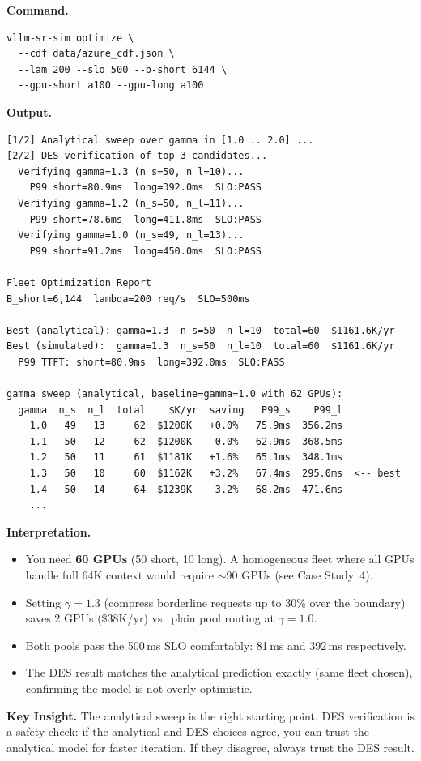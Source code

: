 \documentclass[11pt,a4paper]{article}
\newenvironment{keyinsight}
  {\begin{mdframed}[backgroundcolor=blue!5!white,linecolor=blue!60!black,linewidth=1pt]
   \textbf{Key Insight. }\ignorespaces}
  {\end{mdframed}}
\begin{document}
\textbf{Command.}
\begin{lstlisting}[style=shell]
vllm-sr-sim optimize \
  --cdf data/azure_cdf.json \
  --lam 200 --slo 500 --b-short 6144 \
  --gpu-short a100 --gpu-long a100
\end{lstlisting}

\textbf{Output.}
\begin{lstlisting}[style=output]
[1/2] Analytical sweep over gamma in [1.0 .. 2.0] ...
[2/2] DES verification of top-3 candidates...
  Verifying gamma=1.3 (n_s=50, n_l=10)...
    P99 short=80.9ms  long=392.0ms  SLO:PASS
  Verifying gamma=1.2 (n_s=50, n_l=11)...
    P99 short=78.6ms  long=411.8ms  SLO:PASS
  Verifying gamma=1.0 (n_s=49, n_l=13)...
    P99 short=91.2ms  long=450.0ms  SLO:PASS

Fleet Optimization Report
B_short=6,144  lambda=200 req/s  SLO=500ms

Best (analytical): gamma=1.3  n_s=50  n_l=10  total=60  $1161.6K/yr
Best (simulated):  gamma=1.3  n_s=50  n_l=10  total=60  $1161.6K/yr
  P99 TTFT: short=80.9ms  long=392.0ms  SLO:PASS

gamma sweep (analytical, baseline=gamma=1.0 with 62 GPUs):
  gamma  n_s  n_l  total    $K/yr  saving   P99_s    P99_l
    1.0   49   13     62  $1200K   +0.0%   75.9ms  356.2ms
    1.1   50   12     62  $1200K   -0.0%   62.9ms  368.5ms
    1.2   50   11     61  $1181K   +1.6%   65.1ms  348.1ms
    1.3   50   10     60  $1162K   +3.2%   67.4ms  295.0ms  <-- best
    1.4   50   14     64  $1239K   -3.2%   68.2ms  471.6ms
    ...
\end{lstlisting}

\textbf{Interpretation.}
\begin{itemize}[nosep]
  \item You need \textbf{60 GPUs} (50 short, 10 long).  A homogeneous
    fleet where all GPUs handle full 64K context would require $\sim$90
    GPUs (see Case Study~4).
  \item Setting $\gamma = 1.3$ (compress borderline requests up to
    30\% over the boundary) saves 2 GPUs (\$38K/yr) vs.\ plain pool
    routing at $\gamma = 1.0$.
  \item Both pools pass the 500\,ms SLO comfortably: 81\,ms and
    392\,ms respectively.
  \item The DES result matches the analytical prediction exactly
    (same fleet chosen), confirming the model is not overly optimistic.
\end{itemize}

\begin{keyinsight}
  The analytical sweep is the right starting point.
  DES verification is a safety check: if the analytical and DES
  choices agree, you can trust the analytical model for faster
  iteration.  If they disagree, always trust the DES result.
\end{keyinsight}
\end{document}

